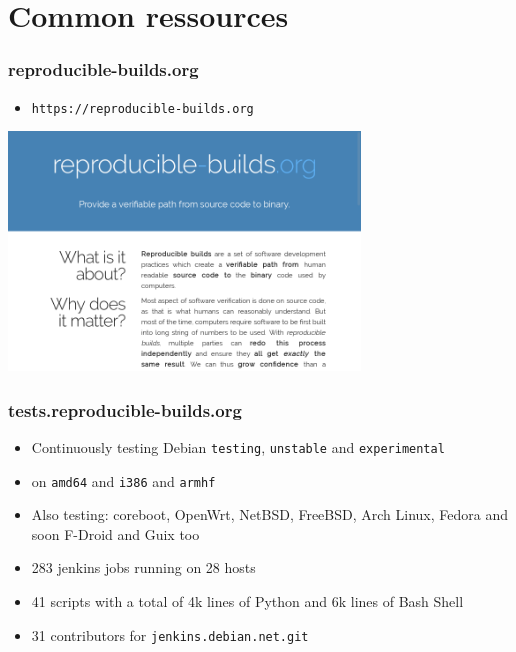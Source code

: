 \documentclass[14pt]{beamer}
\begin{document}
\section{Common ressources}

\begin{frame}
 \frametitle{reproducible-builds.org}

 \begin{itemize}
  \item \texttt{https://reproducible-builds.org}
 \end{itemize}
 \begin{center}
 \includegraphics[width=0.7\textwidth]{images/rbwww1.png}
 \end{center}
\end{frame}

\begin{frame}
 \frametitle{tests.reproducible-builds.org}

 \begin{itemize}
  \item<2-5> Continuously testing Debian \texttt{testing}, \texttt{unstable} and
  \texttt{experimental}
  \item<3-5> on \texttt{amd64} and \texttt{i386} and \texttt{armhf}
  \item<4-5> Also testing: coreboot, OpenWrt, NetBSD, FreeBSD,
  Arch Linux, Fedora and soon F-Droid and Guix too
  \item<5> 283 jenkins jobs running on 28 hosts
  \item<5> 41 scripts with a total of 4k lines of Python and 6k lines of Bash
  Shell
  \item<5> 31 contributors for \texttt{jenkins.debian.net.git}
 \end{itemize}
\end{frame}
\end{document}
